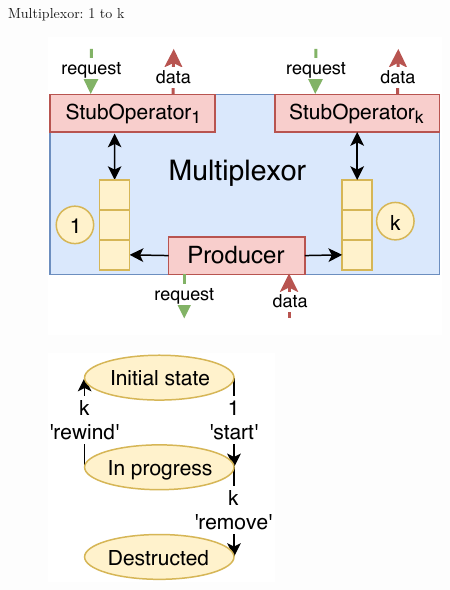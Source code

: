 \documentclass[compress, dvipsnames, unicode]{beamer}
\begin{document}
\begin{frame}{Multiplexor: 1 to k}
\begin{figure}
    \begin{minipage}[c]{0.04\textwidth}\hfill\end{minipage}%
    \begin{minipage}[c]{0.5\textwidth}
        \includegraphics[width=\textwidth]{images/multiplex_arch.pdf}
        \label{fig:multiplex:arch}
    \end{minipage}\hfill
    \begin{minipage}[c]{0.34\textwidth}
        \includegraphics[width=\textwidth]{images/multiplex_state.pdf}
        \label{fig:multiplex:state}
    \end{minipage}
    \begin{minipage}[c]{0.04\textwidth}\hfill\end{minipage}%
\end{figure}
\end{frame}
\end{document}
